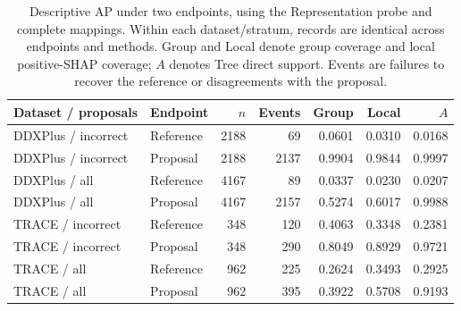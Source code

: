 \begin{table}[!tbp]\centering\footnotesize
\caption{Descriptive AP under two endpoints, using the Representation probe and complete mappings. Within each dataset/stratum, records are identical across endpoints and methods. Group and Local denote group coverage and local positive-SHAP coverage; $A$ denotes Tree direct support. Events are failures to recover the reference or disagreements with the proposal.}
\label{tab:aligned-endpoints}
\begin{tabular}{llrrrrr}\toprule
Dataset / proposals & Endpoint & $n$ & Events & Group & Local & $A$\\\midrule
DDXPlus / incorrect & Reference & 2188 & 69 & 0.0601 & 0.0310 & 0.0168 \\
DDXPlus / incorrect & Proposal & 2188 & 2137 & 0.9904 & 0.9844 & 0.9997 \\
DDXPlus / all & Reference & 4167 & 89 & 0.0337 & 0.0230 & 0.0207 \\
DDXPlus / all & Proposal & 4167 & 2157 & 0.5274 & 0.6017 & 0.9988 \\
TRACE / incorrect & Reference & 348 & 120 & 0.4063 & 0.3348 & 0.2381 \\
TRACE / incorrect & Proposal & 348 & 290 & 0.8049 & 0.8929 & 0.9721 \\
TRACE / all & Reference & 962 & 225 & 0.2624 & 0.3493 & 0.2925 \\
TRACE / all & Proposal & 962 & 395 & 0.3922 & 0.5708 & 0.9193 \\
\bottomrule\end{tabular}\end{table}
